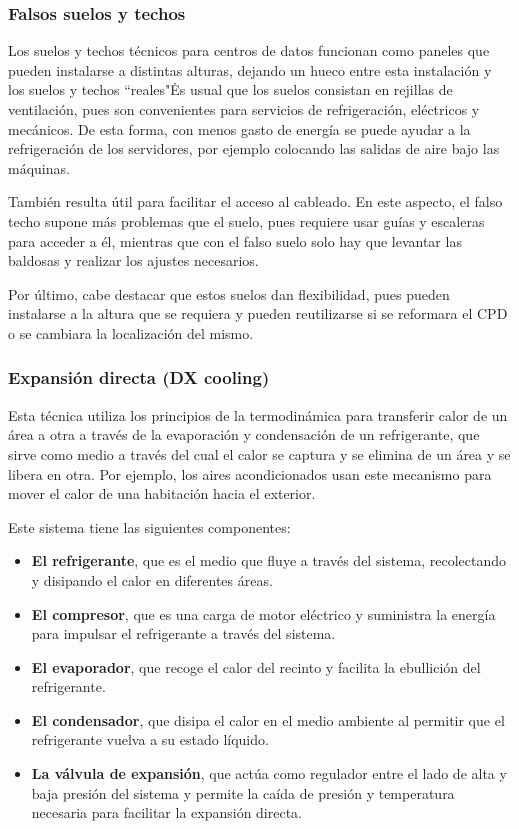 \subsubsection{Falsos suelos y techos} \label{suelos-techos}

Los suelos y techos técnicos para centros de datos funcionan como paneles que pueden instalarse a distintas alturas, dejando un hueco entre esta instalación y los suelos y techos ``reales"\.

Es usual que los suelos consistan en rejillas de ventilación, pues son convenientes para servicios de refrigeración, eléctricos y mecánicos. De esta forma, con menos gasto de energía se puede ayudar a la refrigeración de los servidores, por ejemplo colocando las salidas de aire bajo las máquinas.

También resulta útil para facilitar el acceso al cableado. En este aspecto, el falso techo supone más problemas que el suelo, pues requiere usar guías y escaleras para acceder a él, mientras que con el falso suelo solo hay que levantar las baldosas y realizar los ajustes necesarios.

Por último, cabe destacar que estos suelos dan flexibilidad, pues pueden instalarse a la altura que se requiera y pueden reutilizarse si se reformara el CPD o se cambiara la localización del mismo.

\subsubsection{Expansión directa (DX cooling)}

Esta técnica utiliza los principios de la termodinámica para transferir calor de un área a otra a través de la evaporación y condensación de un refrigerante, que sirve como medio a través del cual el calor se captura y se elimina de un área y se libera en otra. Por ejemplo, los aires acondicionados usan este mecanismo para mover el calor de una habitación hacia el exterior.

Este sistema tiene las siguientes componentes:

\begin{itemize}
    \item {\textbf{El refrigerante}}, que es el medio que fluye a través del sistema, recolectando y disipando el calor en diferentes áreas.
    \item \textbf{El compresor}, que es una carga de motor eléctrico y suministra la energía para impulsar el refrigerante a través del sistema.
    \item \textbf{El evaporador}, que recoge el calor del recinto y facilita la ebullición del refrigerante.
    \item \textbf{El condensador}, que disipa el calor en el medio ambiente al permitir que el refrigerante vuelva a su estado líquido.
    \item \textbf{La válvula de expansión}, que actúa como regulador entre el lado de alta y baja presión del sistema y permite la caída de presión y temperatura necesaria para facilitar la expansión directa.
\end{itemize}



